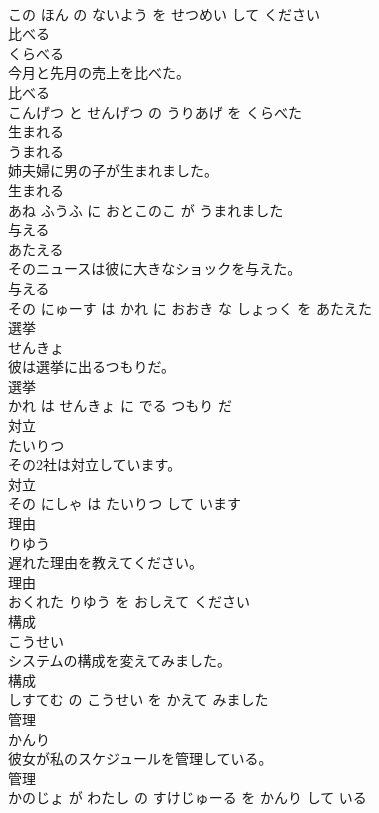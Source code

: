 \documentclass[8pt]{extreport}
\begin{document}
\begin{CJK}{UTF8}{min}
\\	この ほん の ないよう を せつめい して ください			
\\	比べる	
\\	くらべる			
\\	今月と先月の売上を比べた。	
\\	比べる 
\\	こんげつ と せんげつ の うりあげ を くらべた			
\\	生まれる	
\\	うまれる			
\\	姉夫婦に男の子が生まれました。	
\\	生まれる 
\\	あね ふうふ に おとこのこ が うまれました			
\\	与える	
\\	あたえる			
\\	そのニュースは彼に大きなショックを与えた。	
\\	与える 
\\	その にゅーす は かれ に おおき な しょっく を あたえた			
\\	選挙	
\\	せんきょ			
\\	彼は選挙に出るつもりだ。	
\\	選挙 
\\	かれ は せんきょ に でる つもり だ			
\\	対立	
\\	たいりつ			
\\	その2社は対立しています。	
\\	対立 
\\	その にしゃ は たいりつ して います			
\\	理由	
\\	りゆう			
\\	遅れた理由を教えてください。	
\\	理由 
\\	おくれた りゆう を おしえて ください			
\\	構成	
\\	こうせい			
\\	システムの構成を変えてみました。	
\\	構成 
\\	しすてむ の こうせい を かえて みました			
\\	管理	
\\	かんり			
\\	彼女が私のスケジュールを管理している。	
\\	管理 
\\	かのじょ が わたし の すけじゅーる を かんり して いる			

\end{CJK}
\end{document}
